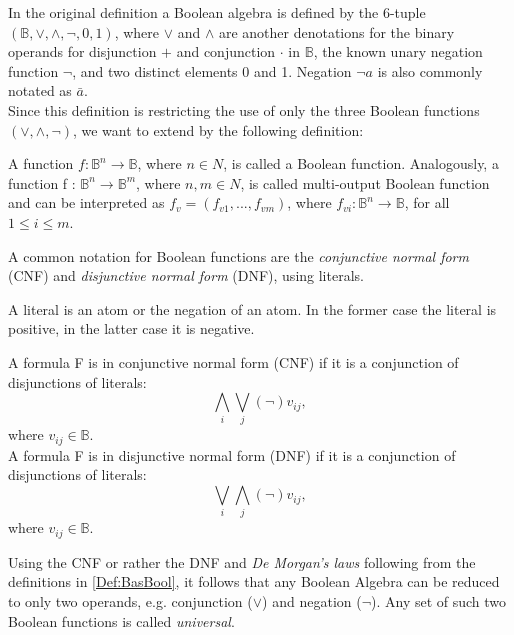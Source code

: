 In the original definition a Boolean algebra is defined by the 6-tuple $(\mathbb{B}, \vee, \wedge, \neg, 0, 1)$, where $\vee$ and $\wedge$ are another denotations for the binary operands for disjunction $+$ and conjunction $\cdot$ in $\mathbb{B}$, the known unary negation function $\neg$, and two distinct elements 0 and 1. Negation $\neg a$ is also commonly notated as $\bar{a}$.\\

Since this definition is restricting the use of only the three Boolean functions $(\vee, \wedge, \neg)$, we want to extend by the following definition:

\begin{definition}
	A function $f : \mathbb{B}^n \to \mathbb{B}$, where $n \in N$, is called a Boolean function.
	Analogously, a
	function f : $\mathbb{B}^n \to \mathbb{B}^m$, where $n, m \in N$, is called multi-output Boolean function
	and can be interpreted as $f_v = (f_{v1}, . . . , f_{vm})$, where $f_{vi} : \mathbb{B}^n \to \mathbb{B}$, for all $1 \leq i \leq m$.
\end{definition}

A common notation for Boolean functions are the \textit{conjunctive normal form} (CNF) and \textit{disjunctive normal form} (DNF), using literals.

\begin{definition}
	A literal is an atom or the negation of an atom. In the former case the literal is positive, in the latter case it is negative.
\end{definition}

\begin{definition}
A formula F is in conjunctive normal form (CNF) if it is a
conjunction of disjunctions of literals:\\
\[\displaystyle\bigwedge_{i} \displaystyle\bigvee_{j} (\neg) v_{ij}, \]
where $v_{ij} \in \mathbb{B}$.\\
A formula F is in disjunctive normal form (DNF) if it is a
conjunction of disjunctions of literals:\\
\[ \displaystyle\bigvee_{i} \displaystyle\bigwedge_{j} (\neg) v_{ij}, \]
where $v_{ij} \in \mathbb{B}$.

\end{definition}

Using the CNF or rather the DNF and \textit{De Morgan's laws} following from the definitions in \ref{Def:BasBool}, it follows that any Boolean Algebra can be reduced to only two operands, e.g. conjunction ($\vee$) and negation ($\neg$). Any set of such two Boolean functions is called \textit{universal}.


